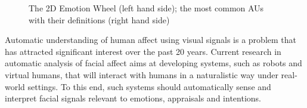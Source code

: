 \documentclass[a4paper, 10pt, conference]{ieeeconf}      %
\begin{document}
\begin{comment}
\begin{table}[h]
\caption{Most common AUs and their description}
\label{AU}
\centering
\begin{tabular}{|c|c|c|c|}
\hline
AU\# & Action & AU\# & Action  \\ 
\hline
1 & inner brow raiser & 2 & outer brow raiser \\
\hline
4 & brow lowerer & 6 & cheek raiser \\
\hline
12 & lip corner puller & 15 & Lip Corner Depressor \\
\hline 
 20 & lip stretcher & 25 & lips part \\
\hline
\end{tabular}
\end{table}

\begin{table}[h]
\caption{Most common AUs and their description}
\label{AU}
\centering
\begin{tabular}{|c|c|}
\hline
AU\# & Action   \\ 
\hline
1 & inner brow raiser \\
\hline
2 & outer brow raiser \\
\hline
4 & brow lowerer \\
\hline
6 & cheek raiser \\
\hline
12 & lip corner puller \\
\hline
15 & \begin{tabular}{@{}c@{}}Lip Corner \\ Depressor \end{tabular} \\
\hline 
 20 & lip stretcher \\
 \hline
25 & lips part \\
\hline
\end{tabular}
\end{table}
\end{comment}

\begin{figure}[h]
\centering
{}
\caption{The 2D Emotion Wheel (left hand side); the most common AUs with their definitions (right hand side) }
\label{2d-wheel-au}
\vskip -0.5cm
\end{figure}

Automatic understanding of human affect using visual signals is a problem that has attracted significant interest over the past 20 years.
Current research in automatic analysis of facial affect aims at developing systems, such as robots and virtual humans, that will interact with humans in a naturalistic way under real-world settings. To this end, such systems should automatically sense and interpret facial signals relevant to emotions, appraisals and intentions. 
\end{document}
